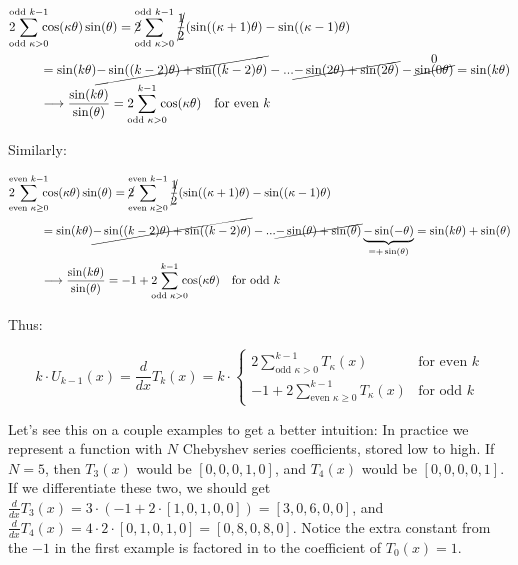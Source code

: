 \documentclass[10pt]{article}
\begin{document}
\begin{align*}
2\!\!\!\!\sum_{\text{odd }\kappa>0}^{\text{odd }k-1} \!\!\!\!&\cos(\kappa\theta)\sin(\theta) = \cancel{2}\!\!\!\!\sum_{\text{odd } \kappa>0}^{\text{odd }k-1} \cancel{\frac{1}{2}}(\sin((\kappa+1)\theta) - \sin((\kappa-1)\theta)\\
&= \sin(k\theta) \cancel{-\sin((k-2)\theta) + \sin((k-2)\theta)} - ... \cancel{-\sin(2\theta) + \sin(2\theta)} - \overset{\text{\normalsize 0}}{\cancel{\sin(0\theta)}} = \sin(k\theta)\\
&\longrightarrow \frac{\sin(k\theta)}{\sin(\theta)} = 2\!\!\!\!\sum_{\text{odd }\kappa>0}^{k-1} \!\!\!\!\cos(\kappa\theta) \quad \text{for even }k
\end{align*}

Similarly:

\begin{align*}
2\!\!\!\!\sum_{\text{even }\kappa \geq 0}^{\text{even }k-1} \!\!\!\!&\cos(\kappa\theta)\sin(\theta) = \cancel{2}\!\!\!\!\sum_{\text{even } \kappa \geq 0}^{\text{even }k-1} \cancel{\frac{1}{2}}(\sin((\kappa+1)\theta) - \sin((\kappa-1)\theta)\\
&= \sin(k\theta) \cancel{-\sin((k-2)\theta) + \sin((k-2)\theta)} - ... \cancel{-\sin(\theta) + \sin(\theta)} \underbrace{-\sin(-\theta)}_{=+\sin(\theta)} = \sin(k\theta) + \sin(\theta)\\
&\longrightarrow \frac{\sin(k\theta)}{\sin(\theta)} = -1 + 2\!\!\!\!\sum_{\text{odd }\kappa>0}^{k-1} \!\!\!\!\cos(\kappa\theta) \quad \text{for odd }k
\end{align*}

Thus:

$$k \cdot U_{k-1}(x) = \frac{d}{dx} T_k(x) = k \cdot \begin{cases}
2\sum_{\text{odd } \kappa>0}^{k-1} T_\kappa(x) & \text{for even } k \\
-1 + 2\sum_{\text{even } \kappa \geq 0}^{k-1} T_\kappa(x) & \text{for odd } k
\end{cases}$$

Let's see this on a couple examples to get a better intuition: In practice we represent a function with $N$ Chebyshev series coefficients, stored low to high. If $N=5$, then $T_3(x)$ would be $[0, 0, 0, 1, 0]$, and $T_4(x)$ would be $[0, 0, 0, 0, 1]$. If we differentiate these two, we should get $\frac{d}{dx}T_3(x) = 3 \cdot(-1 + 2 \cdot [1, 0, 1, 0, 0]) = [3, 0, 6, 0, 0]$, and $\frac{d}{dx}T_4(x) = 4 \cdot 2 \cdot [0, 1, 0, 1, 0] = [0, 8, 0, 8, 0]$. Notice the extra constant from the $-1$ in the first example is factored in to the coefficient of $T_0(x) = 1$.
\end{document}
